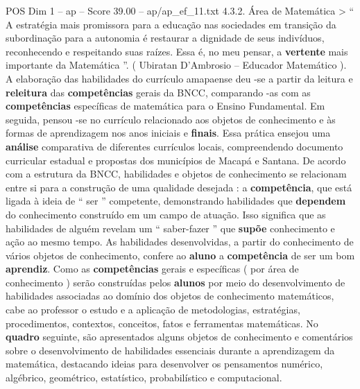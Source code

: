\begin{textsample}{POS Dim 1 – ap – Score 39.00 – ap/ap\_ef\_11.txt}  \label{ex:f1_pos_169}
4.3.2.
Área de Matemática > “ A estratégia mais promissora para a educação nas sociedades em transição da subordinação para a autonomia é restaurar a dignidade de seus indivíduos, reconhecendo e respeitando suas raízes.
Essa é, no meu pensar, a \textbf{vertente} mais importante da Matemática ”. ( Ubiratan D’Ambrosio – Educador Matemático ).
A elaboração das habilidades do currículo amapaense deu -se a partir da leitura e \textbf{releitura} das \textbf{competências} gerais da BNCC, comparando -as com as \textbf{competências} específicas de matemática para o Ensino Fundamental.
Em seguida, pensou -se no currículo relacionado aos objetos de conhecimento e às formas de aprendizagem nos anos iniciais e \textbf{finais}.
Essa prática ensejou uma \textbf{análise} comparativa de diferentes currículos locais, compreendendo documento curricular estadual e propostas dos municípios de Macapá e Santana.
De acordo com a estrutura da BNCC, habilidades e objetos de conhecimento se relacionam entre si para a construção de uma qualidade desejada : a \textbf{competência}, que está ligada à ideia de “ ser ” competente, demonstrando habilidades que \textbf{dependem} do conhecimento construído em um campo de atuação.
Isso significa que as habilidades de alguém revelam um “ saber-fazer ” que \textbf{supõe} conhecimento e ação ao mesmo tempo.
As habilidades desenvolvidas, a partir do conhecimento de vários objetos de conhecimento, confere ao \textbf{aluno} a \textbf{competência} de ser um bom \textbf{aprendiz}.
Como as \textbf{competências} gerais e específicas ( por área de conhecimento ) serão construídas pelos \textbf{alunos} por meio do desenvolvimento de habilidades associadas ao domínio dos objetos de conhecimento matemáticos, cabe ao professor o estudo e a aplicação de metodologias, estratégias, procedimentos, contextos, conceitos, fatos e ferramentas matemáticas.
No \textbf{quadro} seguinte, são apresentados alguns objetos de conhecimento e comentários sobre o desenvolvimento de habilidades essenciais durante a aprendizagem da matemática, destacando ideias para desenvolver os pensamentos numérico, algébrico, geométrico, estatístico, probabilístico e computacional.

\end{textsample}
